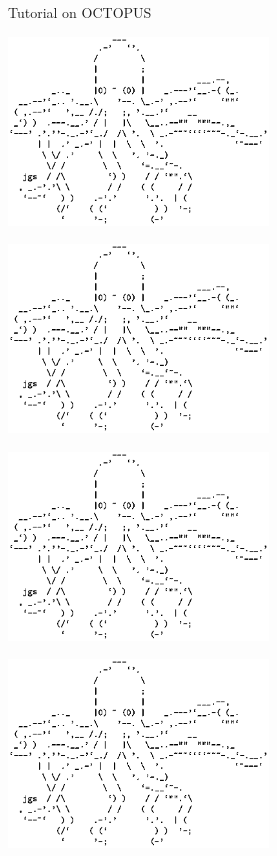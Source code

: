 \documentclass{article}
\begin{document}
\begin{center}
\Large Tutorial on OCTOPUS
\end{center}

\vspace{1cm}

\begin{center}
\hspace*{-3cm}
\includegraphics[height=5cm]{img/cover}
\end{center}

\begin{flushright}
\includegraphics[height=5cm]{img/cover}
\end{flushright}

\vspace{-2cm}

\begin{flushleft}
\includegraphics[height=5cm]{img/cover}
\end{flushleft}

\begin{flushright}
\includegraphics[height=5cm]{img/cover}
\hspace*{2cm}
\end{flushright}
\end{document}
